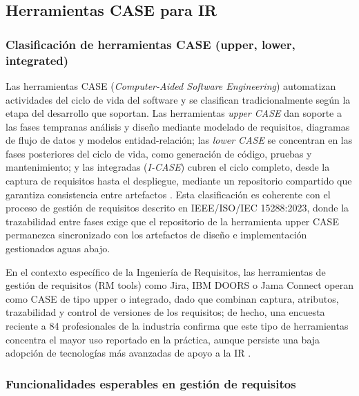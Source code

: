 \documentclass[journal,onecolumn]{IEEEtran}
\begin{document}
	
	\subsection{Herramientas CASE para IR}
	
	\subsubsection{Clasificación de herramientas CASE (upper, lower, integrated)}
	
	Las herramientas CASE (\emph{Computer-Aided Software Engineering}) automatizan actividades del ciclo de vida del software y se clasifican tradicionalmente según la etapa del desarrollo que soportan. Las herramientas \emph{upper CASE} dan soporte a las fases tempranas análisis y diseño mediante modelado de requisitos, diagramas de flujo de datos y modelos entidad-relación; las \emph{lower CASE} se concentran en las fases posteriores del ciclo de vida, como generación de código, pruebas y mantenimiento; y las integradas (\emph{I-CASE}) cubren el ciclo completo, desde la captura de requisitos hasta el despliegue, mediante un repositorio compartido que garantiza consistencia entre artefactos \cite{ieee29148}. Esta clasificación es coherente con el proceso de gestión de requisitos descrito en IEEE/ISO/IEC 15288:2023, donde la trazabilidad entre fases exige que el repositorio de la herramienta upper CASE permanezca sincronizado con los artefactos de diseño e implementación gestionados aguas abajo.
	
	En el contexto específico de la Ingeniería de Requisitos, las herramientas de gestión de requisitos (RM tools) como Jira, IBM DOORS o Jama Connect operan como CASE de tipo upper o integrado, dado que combinan captura, atributos, trazabilidad y control de versiones de los requisitos; de hecho, una encuesta reciente a 84 profesionales de la industria confirma que este tipo de herramientas concentra el mayor uso reportado en la práctica, aunque persiste una baja adopción de tecnologías más avanzadas de apoyo a la IR \cite{ozkaya2023}.
	
	\subsubsection{Funcionalidades esperables en gestión de requisitos}
	
\end{document}
